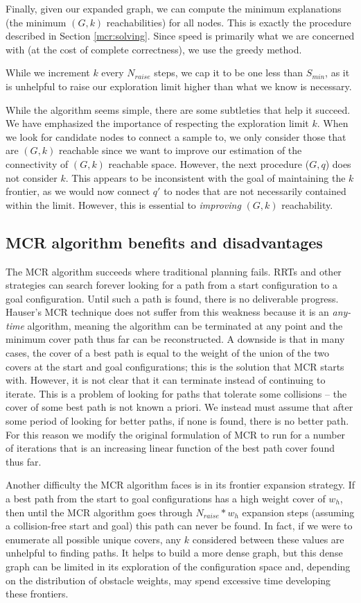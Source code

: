 Finally, given our expanded graph, we can compute the minimum explanations (the minimum $(G,k)$ reachabilities) for all nodes. This is exactly the procedure described in Section \ref{mcr:solving}. Since speed is primarily what we are concerned with (at the cost of complete correctness), we use the greedy method.

While we increment $k$ every $N_{raise}$ steps, we cap it to be one less than $S_{min}$, as it is unhelpful to raise our exploration limit higher than what we know is necessary. 

While the algorithm seems simple, there are some subtleties that help it succeed. We have emphasized the importance of respecting the exploration limit $k$. When we look for candidate nodes to connect a sample to, we only consider those that are $(G,k)$ reachable since we want to improve our estimation of the connectivity of $(G,k)$ reachable space. However, the next procedure ($G,q$) does not consider $k$. This appears to be inconsistent with the goal of maintaining the $k$ frontier, as we would now connect $q'$ to nodes that are not necessarily contained within the limit. However, this is essential to \emph{improving} $(G,k)$ reachability.

\subsection{MCR algorithm benefits and disadvantages}
The MCR algorithm succeeds where traditional planning fails. RRTs and other strategies can search forever looking for a path from a start configuration to a goal configuration. Until such a path is found, there is no deliverable progress. Hauser's MCR technique does not suffer from this weakness because it is an \emph{any-time} algorithm, meaning the algorithm can be terminated at any point and the minimum cover path thus far can be reconstructed. A downside is that in many cases, the cover of a best path is equal to the weight of the union of the two covers at the start and goal configurations; this is the solution that MCR starts with. However, it is not clear that it can terminate instead of continuing to iterate. This is a problem of looking for paths that tolerate some collisions -- the cover of some best path is not known a priori. We instead must assume that after some period of looking for better paths, if none is found, there is no better path. For this reason we modify the original formulation of MCR to run for a number of iterations that is an increasing linear function of the best path cover found thus far.

Another difficulty the MCR algorithm faces is in its frontier expansion strategy. If a best path from the start to goal configurations has a high weight cover of $w_h$, then until the MCR algorithm goes through $N_{raise} * w_h$ expansion steps (assuming a collision-free start and goal) this path can never be found. In fact, if we were to enumerate all possible unique covers, any $k$ considered between these values are unhelpful to finding paths. It helps to build a more dense graph, but this dense graph can be limited in its exploration of the configuration space and, depending on the distribution of obstacle weights, may spend excessive time developing these frontiers.

